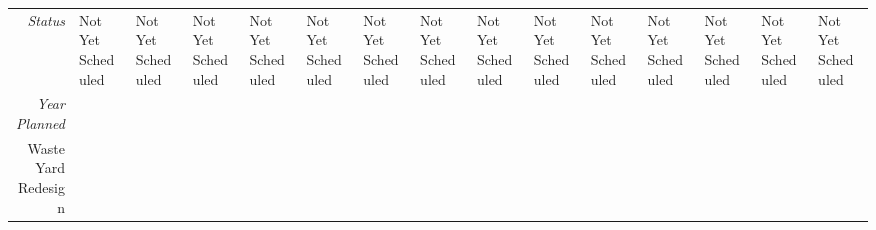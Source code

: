 \begin{tabularx}{\textwidth}{r|X|X|X|X|X|X|X|X|X|X|X|X|X|X|}
    \multicolumn{1}{|r|}{\cellcolor{ccorangelight}\textit{Status}}                & Not Yet Scheduled                                                         & Not Yet Scheduled                                                         & Not Yet Scheduled                                                         & Not Yet Scheduled                                                         & Not Yet Scheduled                                                         & Not Yet Scheduled                                                         & Not Yet Scheduled                                                         & Not Yet Scheduled                                                         & Not Yet Scheduled                                                         & Not Yet Scheduled                                                         & Not Yet Scheduled                                                         & Not Yet Scheduled                                                         & Not Yet Scheduled                                                         & Not Yet Scheduled                                                         \\
    \multicolumn{1}{|r|}{\cellcolor{ccorangelight}\textit{Year Planned}}                  &                                                      &                                                      &                                                      &                                                      &                                                      &                                                      &                                                      &                                                      &                                                      &                                                      &                                                      &                                                      &                                                      &                                                      \\ \hline
\multicolumn{1}{|V{.2\columnwidth}|}{\cellcolor{ccorangelight}Waste Yard Redesign}          &                                                                  &                                                                  &                                                                  &                                                                  &                                                                  &                                                                  &                                                                  &                                                                  &                                                                  &                                                                  &                                                                  &                                                                  &                                                                  &                                                                  \\

\end{tabularx}
